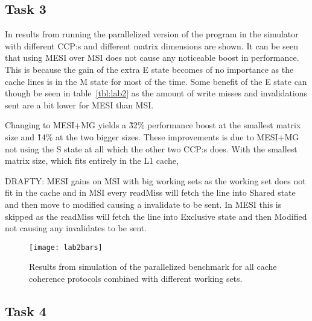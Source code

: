 \subsection{Task 3}

In  results from running the parallelized version of the program in the simulator with different CCP:s and different matrix dimensions are shown. It can be seen that using MESI over MSI does not cause any noticeable boost in performance. This is because the gain of the extra E state becomes of no importance as the cache lines is in the M state for most of the time. Some benefit of the E state can though be seen in table~\ref{tbl:lab2} as the amount of write misses and invalidations sent are a bit lower for MESI than MSI. 

Changing to MESI+MG yields a \~32\% performance boost at the smallest matrix size and \~14\% at the two bigger sizes. These improvements is due to MESI+MG not using the S state at all which the other two CCP:s does. With the smallest matrix size, which fits entirely in the L1 cache,  

DRAFTY:
MESI gains on MSI with big working sets as the working set does not fit in the cache and in MSI every readMiss will fetch the line into Shared state and then move to modified causing a invalidate to be sent. In MESI this is skipped as the readMiss will fetch the line into Exclusive state and then Modified not causing any invalidates to be sent.

\begin{figure}[t]
	\center
	\texttt{[image: lab2bars]}
	\caption{Results from simulation of the parallelized benchmark for all cache coherence protocols combined with different working sets.}
	\label{fig:lab2}
\end{figure}

\subsection{Task 4}
